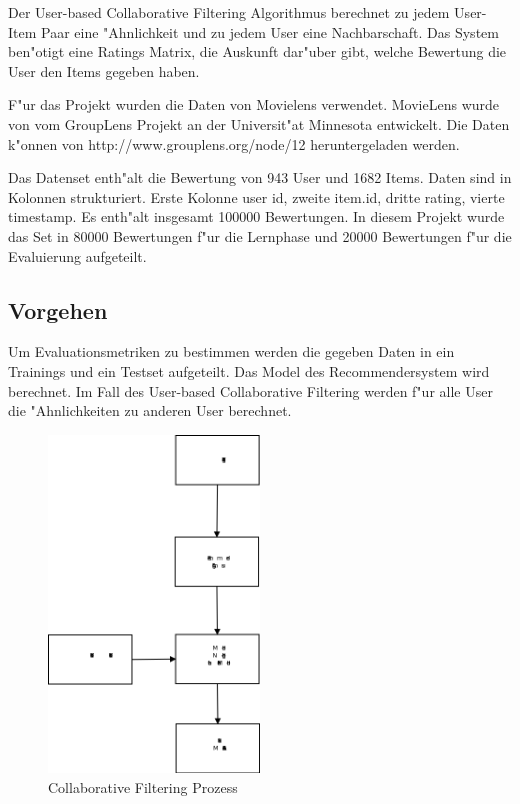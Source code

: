 \documentclass[a4paper, 11pt]{article}
\begin{document}
 Der User-based Collaborative Filtering Algorithmus berechnet zu jedem User-Item Paar eine "Ahnlichkeit und zu jedem User eine Nachbarschaft. Das System ben"otigt eine Ratings Matrix, die Auskunft dar"uber gibt, welche Bewertung die User den Items gegeben haben.

F"ur das Projekt wurden die Daten von Movielens verwendet. MovieLens wurde von vom GroupLens Projekt an der Universit"at Minnesota entwickelt. Die Daten k"onnen von http://www.grouplens.org/node/12 heruntergeladen werden. 

Das Datenset enth"alt die Bewertung von 943 User und 1682 Items.  Daten sind in Kolonnen strukturiert. Erste Kolonne user id, zweite item.id, dritte rating, vierte timestamp. Es enth"alt insgesamt 100000 Bewertungen. In diesem Projekt wurde das Set in 80000 Bewertungen f"ur die Lernphase und 20000 Bewertungen f"ur die Evaluierung aufgeteilt. 



\subsection{Vorgehen}
\label{sec:procedure}

Um Evaluationsmetriken zu bestimmen werden die gegeben Daten in ein Trainings und ein Testset aufgeteilt. Das Model des Recommendersystem wird berechnet. Im Fall des User-based Collaborative Filtering werden f"ur alle User die "Ahnlichkeiten zu anderen User berechnet.

\begin{figure}
  \centering
      \includegraphics[width=0.5\textwidth]{evaluation}
  \caption{Collaborative Filtering Prozess}
\end{figure}
\end{document}
